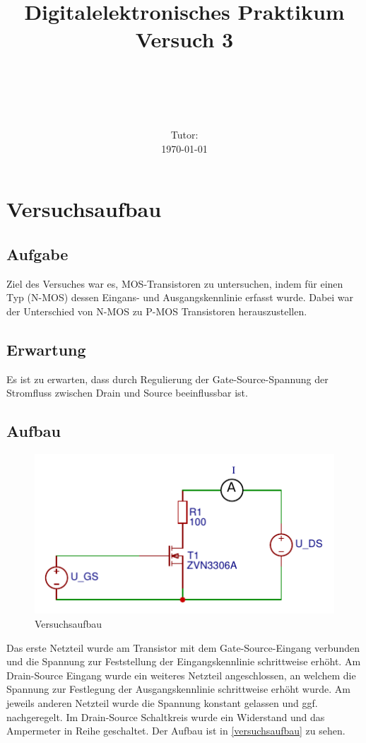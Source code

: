 \documentclass[11pt, a4paper]{article}
\title{\textbf{Digitalelektronisches Praktikum\\ Versuch 3}}
\author{\ATutantName \\ \emph{\ATutantEmail} \and \BTutantName\\ \emph{\BTutantEmail}}
\date{\Gruppennummer \\[3ex] Tutor: \Tutorname \\[3ex] \today}
\begin{document}
\clearpage
\maketitle
\thispagestyle{empty}
\newpage


\section*{Versuchsaufbau}
\subsection*{Aufgabe}
Ziel des Versuches war es, MOS-Transistoren zu untersuchen, indem für einen Typ (N-MOS) dessen Eingans- und Ausgangskennlinie erfasst wurde. Dabei war der Unterschied von N-MOS zu P-MOS Transistoren herauszustellen.
\subsection*{Erwartung}
Es ist zu erwarten, dass durch Regulierung der Gate-Source-Spannung der Stromfluss zwischen Drain und Source beeinflussbar ist.
\subsection*{Aufbau}
\begin{figure}
    \centering
    \includegraphics[width=\linewidth]{aufbau.pdf}
    \caption{Versuchsaufbau}
    \label{versuchsaufbau}
\end{figure}
Das erste Netzteil wurde am Transistor mit dem Gate-Source-Eingang verbunden und die Spannung zur Feststellung der Eingangskennlinie schrittweise erhöht. Am Drain-Source Eingang wurde ein weiteres Netzteil angeschlossen, an welchem die Spannung zur Festlegung der Ausgangskennlinie schrittweise erhöht wurde. Am jeweils anderen Netzteil wurde die Spannung konstant gelassen und ggf. nachgeregelt. Im Drain-Source Schaltkreis wurde ein Widerstand und das Ampermeter in Reihe geschaltet. Der Aufbau ist in \autoref{versuchsaufbau} zu sehen.
\end{document}
